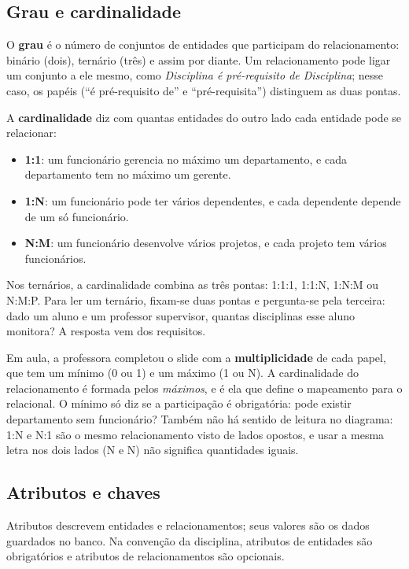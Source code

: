\subsection{Grau e cardinalidade}

O \textbf{grau} é o número de conjuntos de entidades que participam do
relacionamento: binário (dois), ternário (três) e assim por diante. Um
relacionamento pode ligar um conjunto a ele mesmo, como \emph{Disciplina
é pré-requisito de Disciplina}; nesse caso, os papéis (``é pré-requisito
de'' e ``pré-requisita'') distinguem as duas pontas.

A \textbf{cardinalidade} diz com quantas entidades
do outro lado cada entidade pode se relacionar:

\begin{itemize}
	\item \textbf{1:1}: um funcionário gerencia no máximo um departamento,
	e cada departamento tem no máximo um gerente.
	\item \textbf{1:N}: um funcionário pode ter vários dependentes, e cada
	dependente depende de um só funcionário.
	\item \textbf{N:M}: um funcionário desenvolve vários projetos, e cada
	projeto tem vários funcionários.
\end{itemize}

Nos ternários, a cardinalidade combina as três pontas: 1:1:1, 1:1:N,
1:N:M ou N:M:P. Para ler um ternário, fixam-se duas pontas e pergunta-se
pela terceira: dado um aluno e um professor supervisor, quantas
disciplinas esse aluno monitora? A resposta vem dos requisitos.

Em aula, a professora completou o slide com a \textbf{multiplicidade} de
cada papel, que tem um mínimo (0 ou 1) e um máximo (1 ou N). A
cardinalidade do relacionamento é formada pelos \emph{máximos}, e é ela
que define o mapeamento para o relacional. O mínimo só diz se a
participação é obrigatória: pode existir departamento sem funcionário?
Também não há sentido de leitura no diagrama: 1:N e N:1 são o mesmo
relacionamento visto de lados opostos, e usar a mesma letra nos dois
lados (N e N) não significa quantidades iguais.

\subsection{Atributos e chaves}

Atributos descrevem entidades e relacionamentos; seus valores são os
dados guardados no banco. Na convenção da disciplina, atributos de
entidades são obrigatórios e atributos de relacionamentos são opcionais.

